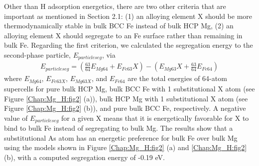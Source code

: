 Other than H adsorption energetics, there are two other criteria that are important as mentioned in Section 2.1: (1) an alloying element X should be more thermodynamically stable in bulk \ac{BCC} Fe instead of bulk \ac{HCP} Mg, (2) an alloying element X should segregate to an Fe surface rather than remaining in bulk Fe. Regarding the first criterion, we calculated the segregation energy to the second-phase particle, $E_{particle seg}$, via
\begin{align}
 E_{particle seg} = (\frac{63}{64}E_{Mg64} + E_{Fe63}X) - (E_{Mg63}X + \frac{63}{64}E_{Fe64})
 \label{Chap:Mg_H:eq:particle_seg}
\end{align}
where $E_{Mg64}$, $E_{Fe63X}$, $E_{Mg63X}$, and $E_{Fe64}$ are the total energies of 64-atom supercells for pure bulk HCP Mg, bulk \ac{BCC} Fe with 1 substitutional X atom (see Figure \ref{Chap:Mg_H:fig2} (a)), bulk HCP Mg with 1 substitutional X atom (see Figure \ref{Chap:Mg_H:fig2} (b)), and pure bulk \ac{BCC} Fe, respectively. A negative value of $E_{particle seg}$ for a given X means that it is energetically favorable for X to bind to bulk Fe instead of segregating to bulk Mg. The results show that a substitutional As atom has an energetic preference for bulk Fe over bulk Mg using the models shown in Figure \ref{Chap:Mg_H:fig2} (a) and \ref{Chap:Mg_H:fig2} (b), with a computed segregation energy of -0.19 eV.

